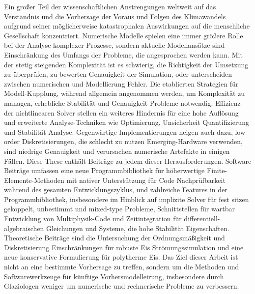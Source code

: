 Ein großer Teil der wissenschaftlichen Anstrengungen weltweit auf das Verständnis und die Vorhersage der Voraus und Folgen des Klimawandels aufgrund seiner möglicherweise katastrophalen Auswirkungen auf die menschliche Gesellschaft konzentriert. 
Numerische Modelle spielen eine immer größere Rolle bei der Analyse komplexer Prozesse, sondern aktuelle Modellansätze sind Einschränkung des Umfangs der Probleme, die angesprochen werden kann. 
Mit der stetig steigenden Komplexität ist es schwierig, die Richtigkeit der Umsetzung zu überprüfen, zu bewerten Genauigkeit der Simulation, oder unterscheiden zwischen numerischen und Modellierung Fehler. 
Die etablierten Strategien für Modell-Kupplung, während allgemein angenommen werden, um Komplexität zu managen, erhebliche Stabilität und Genauigkeit Probleme notwendig. 
Effizienz der nichtlinearen Solver stellen ein weiteres Hindernis für eine hohe Auflösung und erweiterte Analyse-Techniken wie Optimierung, Unsicherheit Quantifizierung und Stabilität Analyse. 
Gegenwärtige Implementierungen neigen auch dazu, low-order Diskretisierungen, die schlecht zu nutzen Emerging-Hardware verwenden, sind niedrige Genauigkeit und verursachen numerische Artefakte in einigen Fällen. 
Diese These enthält Beiträge zu jedem dieser Herausforderungen. 
Software Beiträge umfassen eine neue Programmbibliothek für höherwertige Finite-Elemente-Methoden mit nativer Unterstützung für Code Nachprüfbarkeit während des gesamten Entwicklungszyklus, und zahlreiche Features in der {\PETSc} Programmbibliothek, insbesondere im Hinblick auf implizite Solver für fest sitzen gekoppelt, unbestimmt und mixed-type Probleme, Schnittstellen für wartbar Entwicklung von Multiphysik-Code und Zeitintegration für differentiell-algebraischen Gleichungen und Systeme, die hohe Stabilität Eigenschaften. 
Theoretische Beiträge sind die Untersuchung der Ordnungsmäßigkeit und Diskretisierung Einschränkungen für robuste Eis Strömungssimulation und eine neue konservative Formulierung für polytherme Eis. 
Das Ziel dieser Arbeit ist nicht an eine bestimmte Vorhersage zu treffen, sondern um die Methoden und Softwarewerkzeuge für künftige Vorhersmodelleirung, insbesondere durch Glaziologen weniger um numerische und rechnerische Probleme zu verbessern. 
